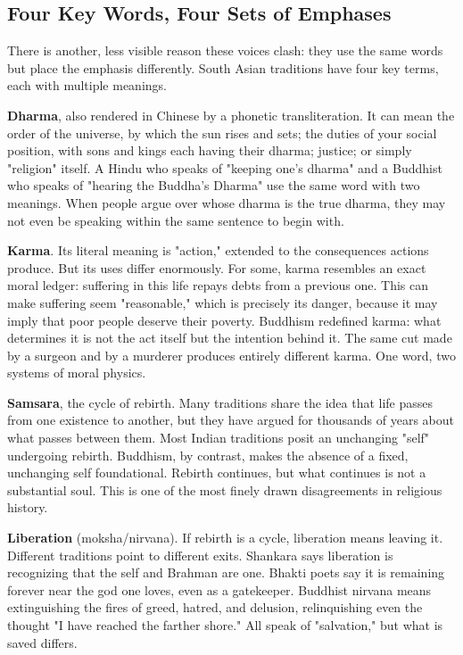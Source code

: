 \subsection{Four Key Words, Four Sets of Emphases}
There is another, less visible reason these voices clash: they use the same words but place the emphasis differently. South Asian traditions have four key terms, each with multiple meanings.

\textbf{Dharma}, also rendered in Chinese by a phonetic transliteration. It can mean the order of the universe, by which the sun rises and sets; the duties of your social position, with sons and kings each having their dharma; justice; or simply "religion" itself. A Hindu who speaks of "keeping one's dharma" and a Buddhist who speaks of "hearing the Buddha's Dharma" use the same word with two meanings. When people argue over whose dharma is the true dharma, they may not even be speaking within the same sentence to begin with.

\textbf{Karma}. Its literal meaning is "action," extended to the consequences actions produce. But its uses differ enormously. For some, karma resembles an exact moral ledger: suffering in this life repays debts from a previous one. This can make suffering seem "reasonable," which is precisely its danger, because it may imply that poor people deserve their poverty. Buddhism redefined karma: what determines it is not the act itself but the intention behind it. The same cut made by a surgeon and by a murderer produces entirely different karma. One word, two systems of moral physics.

\textbf{Samsara}, the cycle of rebirth. Many traditions share the idea that life passes from one existence to another, but they have argued for thousands of years about what passes between them. Most Indian traditions posit an unchanging "self" undergoing rebirth. Buddhism, by contrast, makes the absence of a fixed, unchanging self foundational. Rebirth continues, but what continues is not a substantial soul. This is one of the most finely drawn disagreements in religious history.

\textbf{Liberation} (moksha/nirvana). If rebirth is a cycle, liberation means leaving it. Different traditions point to different exits. Shankara says liberation is recognizing that the self and Brahman are one. Bhakti poets say it is remaining forever near the god one loves, even as a gatekeeper. Buddhist nirvana means extinguishing the fires of greed, hatred, and delusion, relinquishing even the thought "I have reached the farther shore." All speak of "salvation," but what is saved differs.

